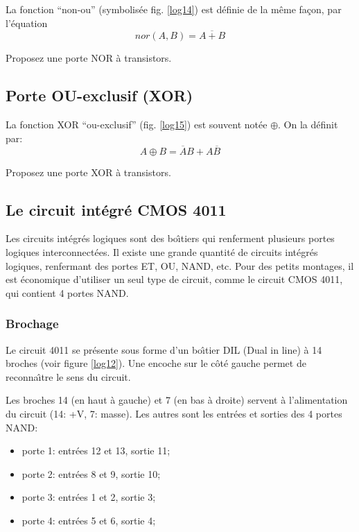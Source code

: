 La fonction ``non-ou'' (symbolis\'ee fig. \ref{log14}) est d\'efinie de la m\^eme fa\c{c}on, par l'\'equation
$$nor(A,B) = \overline{A + B}$$


\begin{exercice}{} Proposez une porte NOR \`a transistors.
\end{exercice}

\subsection{Porte OU-exclusif (XOR)}

La fonction XOR ``ou-exclusif'' (fig. \ref{log15}) est souvent not\'ee
$\oplus$. On la d\'efinit par:
$$A \oplus B = \overline{A}B +A\overline{B}$$


\begin{exercice}{} Proposez une porte XOR \`a transistors.
\end{exercice}

\subsection{Le circuit int\'egr\'e CMOS 4011}

Les circuits int\'egr\'es logiques sont des bo\^{\i}tiers qui renferment plusieurs
portes logiques interconnect\'ees. Il existe une grande quantit\'e de
circuits int\'egr\'es logiques, renfermant des portes ET, OU, NAND, etc.
Pour des petits montages, il est \'economique d'utiliser un seul
type de circuit, comme le circuit CMOS 4011, qui contient 4 portes NAND.

\subsubsection{Brochage}

Le circuit 4011 se pr\'esente sous forme d'un bo\^{\i}tier DIL (Dual in line)
\`a 14 broches (voir figure \ref{log12}). Une encoche sur le c\^ot\'e gauche
permet de reconna\^{\i}tre le sens du circuit.

Les broches 14 (en haut \`a gauche) et 7 (en bas \`a droite) servent \`a 
l'alimentation du circuit 
(14: +V, 7: masse). Les autres sont les entr\'ees et sorties des
4 portes NAND:
\begin{itemize}
\item porte 1: entr\'ees 12 et 13, sortie 11;
\item porte 2: entr\'ees 8 et 9, sortie 10;
\item porte 3: entr\'ees 1 et 2, sortie 3;
\item porte 4: entr\'ees 5 et 6, sortie 4;
\end{itemize}

